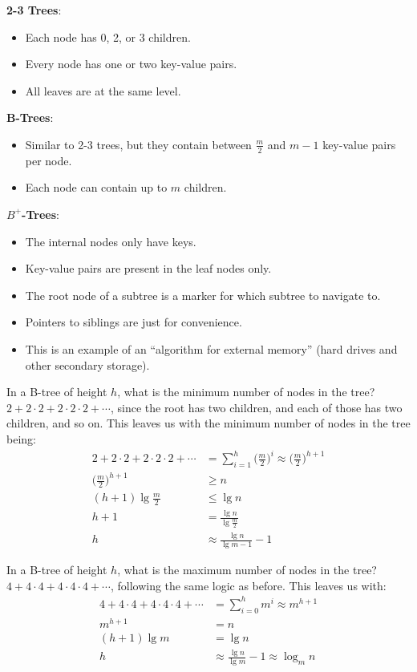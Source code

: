 \documentclass[]{article}
\theoremstyle{definition}
\begin{document}
			\textbf{2-3 Trees}:
			\begin{itemize}
				\item Each node has 0, 2, or 3 children.
				\item Every node has one or two key-value pairs.
				\item All leaves are at the same level.
			\end{itemize}

			\textbf{B-Trees}:
			\begin{itemize}
				\item Similar to 2-3 trees, but they contain between $\frac{m}{2}$ and $m - 1$ key-value pairs per node.
				\item Each node can contain up to $m$ children.
			\end{itemize}

			\textbf{$B^+$-Trees}:
			\begin{itemize}
				\item The internal nodes only have keys.
				\item Key-value pairs are present in the leaf nodes only.
				\item The root node of a subtree is a marker for which subtree to navigate to.
				\item Pointers to siblings are just for convenience.
				\item This is an example of an ``algorithm for external memory'' (hard drives and other secondary storage). 
			\end{itemize}

			In a B-tree of height $h$, what is the minimum number of nodes in the tree? $2 + 2 \cdot 2 + 2 \cdot 2 \cdot 2 + \cdots$, since the root has two children, and each of those has two children, and so on. This leaves us with the minimum number of nodes in the tree being:
			\begin{align*}
				2 + 2 \cdot 2 + 2 \cdot 2 \cdot 2 + \cdots &= \sum_{i = 1}^{h} \bigg(\frac{m}{2}\bigg)^i \approx \bigg(\frac{m}{2}\bigg)^{h + 1} \\
				\bigg(\frac{m}{2}\bigg)^{h + 1} &\ge n \\
				(h + 1) \lg\frac{m}{2} &\le \lg n \\
				h + 1 &= \frac{\lg n}{\lg \frac{m}{2}} \\
				h &\approx \frac{\lg n}{\lg m - 1} - 1
			\end{align*}

			In a B-tree of height $h$, what is the maximum number of nodes in the tree? $4 + 4 \cdot 4 + 4 \cdot 4 \cdot 4 + \cdots$, following the same logic as before. This leaves us with:
			\begin{align*}
				4 + 4 \cdot 4 + 4 \cdot 4 \cdot 4 + \cdots &= \sum_{i = 0}^{h} m^i \approx m^{h + 1} \\
				m^{h + 1} &= n \\
				(h + 1) \lg m &= \lg n \\
				h &\approx \frac{\lg n}{\lg m} - 1 \approx \log_m n
			\end{align*}
			
\end{document}
